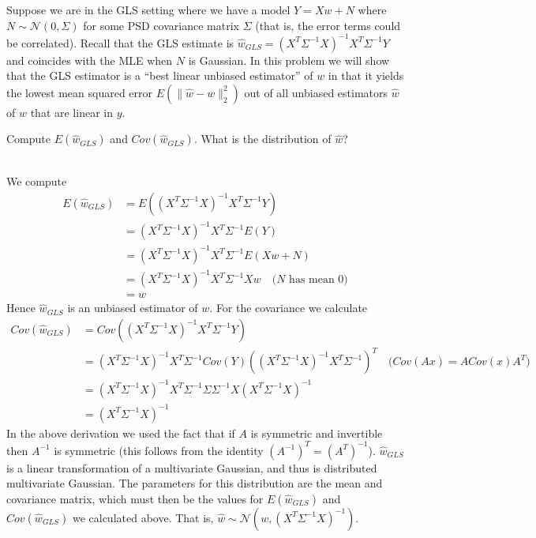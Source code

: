 \newcommand*{\inner}[2]{\langle #1,#2\rangle}

Suppose we are in the GLS setting where we have a model $Y=Xw+N$ where $N\sim \mathcal{N}(0,\Sigma)$ for some PSD covariance matrix $\Sigma$ (that is, the error terms could be correlated). Recall that the GLS estimate is $\hat{w}_{GLS}=(X^T\Sigma^{-1}X)^{-1}X^T\Sigma^{-1}Y$ and coincides with the MLE when $N$ is Gaussian. In this problem we will show that the GLS estimator is a ``best linear unbiased estimator'' of $w$ in that it yields the lowest mean squared error $E(\|\hat{w}-w\|_2^2)$ out of all unbiased estimators $\hat{w}$ of $w$ that are linear in $y$.
\begin{Parts}
\Part Compute $E(\hat{w}_{GLS})$ and $Cov(\hat{w}_{GLS})$. What is the distribution of $\hat{w}$?\\
\\
\begin{solution}
We compute
\begin{align*}
    E(\hat{w}_{GLS})&=E((X^T\Sigma^{-1}X)^{-1}X^T\Sigma^{-1}Y)\\
    &=(X^T\Sigma^{-1}X)^{-1}X^T\Sigma^{-1}E(Y)\\
    &=(X^T\Sigma^{-1}X)^{-1}X^T\Sigma^{-1}E(Xw+N)\\
    &=(X^T\Sigma^{-1}X)^{-1}X^T\Sigma^{-1}Xw\quad\text{($N$ has mean 0)}\\
    &=w
\end{align*}
Hence $\hat{w}_{GLS}$ is an unbiased estimator of $w$. For the covariance we calculate
\begin{align*}
    Cov(\hat{w}_{GLS})&=Cov((X^T\Sigma^{-1}X)^{-1}X^T\Sigma^{-1}Y)\\
    &=(X^T\Sigma^{-1}X)^{-1}X^T\Sigma^{-1}Cov(Y)((X^T\Sigma^{-1}X)^{-1}X^T\Sigma^{-1})^T\quad\text{($Cov(Ax)=ACov(x)A^T$)}\\
    &=(X^T\Sigma^{-1}X)^{-1}X^T\Sigma^{-1} \Sigma \Sigma^{-1}X(X^T\Sigma^{-1}X)^{-1}\\
    &=(X^T\Sigma^{-1}X)^{-1}
\end{align*}
In the above derivation we used the fact that if $A$ is symmetric and invertible then $A^{-1}$ is symmetric (this follows from the identity $(A^{-1})^T=(A^T)^{-1}$). $\hat{w}_{GLS}$ is a linear transformation of a multivariate Gaussian, and thus is distributed multivariate Gaussian. The parameters for this distribution are the mean and covariance matrix, which must then be the values for $E(\hat{w}_{GLS})$ and $Cov(\hat{w}_{GLS})$ we calculated above. That is, $\hat{w}\sim \mathcal{N}(w, (X^T\Sigma^{-1}X)^{-1})$.

\end{solution}
\end{Parts}

